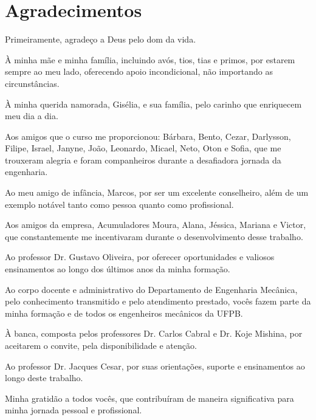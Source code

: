 \chapter*{Agradecimentos}

\thispagestyle{empty}

Primeiramente, agradeço a Deus pelo dom da vida.

À minha mãe e minha família, incluindo avós, tios, tias e primos, por estarem sempre ao meu lado, oferecendo apoio incondicional, não importando as circunstâncias.

À minha querida namorada, Gisélia, e sua família, pelo carinho que enriquecem meu dia a dia.

Aos amigos que o curso me proporcionou: Bárbara, Bento, Cezar, Darlysson, Filipe, Israel, Janyne, João, Leonardo, Micael, Neto, Oton e Sofia, que me trouxeram alegria e foram companheiros durante a desafiadora jornada da engenharia.

Ao meu amigo de infância, Marcos, por ser um excelente conselheiro, além de um exemplo notável tanto como pessoa quanto como profissional.

Aos amigos da empresa, Acumuladores Moura, Alana, Jéssica, Mariana e Victor, que constantemente me incentivaram durante o desenvolvimento desse trabalho.

Ao professor Dr. Gustavo Oliveira, por oferecer oportunidades e valiosos ensinamentos ao longo dos últimos anos da minha formação.

Ao corpo docente e administrativo do Departamento de Engenharia Mecânica, pelo conhecimento transmitido e pelo atendimento prestado, vocês fazem parte da minha formação e de todos os engenheiros mecânicos da UFPB.

À banca, composta pelos professores Dr. Carlos Cabral e Dr. Koje Mishina, por aceitarem o convite, pela disponibilidade e atenção.

Ao professor Dr. Jacques Cesar, por suas orientações, suporte e ensinamentos ao longo deste trabalho.

Minha gratidão a todos vocês, que contribuíram de maneira significativa para minha jornada pessoal e profissional.
